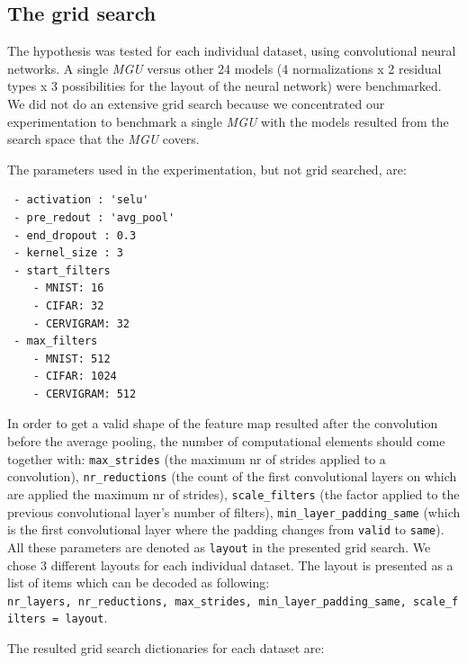 \documentclass[11pt]{article}
\begin{document}
    \hypertarget{the-grid-search}{%
\subsection{The grid search}\label{the-grid-search}}

The hypothesis was tested for each individual dataset, using
convolutional neural networks. A single \emph{MGU} versus other 24
models (4 normalizations x 2 residual types x 3 possibilities for the
layout of the neural network) were benchmarked. We did not do an
extensive grid search because we concentrated our experimentation to
benchmark a single \emph{MGU} with the models resulted from the search
space that the \emph{MGU} covers.

The parameters used in the experimentation, but not grid searched, are:

\begin{verbatim}
 - activation : 'selu'
 - pre_redout : 'avg_pool'
 - end_dropout : 0.3
 - kernel_size : 3
 - start_filters
    - MNIST: 16
    - CIFAR: 32
    - CERVIGRAM: 32
 - max_filters
    - MNIST: 512
    - CIFAR: 1024    
    - CERVIGRAM: 512
\end{verbatim}

In order to get a valid shape of the feature map resulted after the
convolution before the average pooling, the number of computational
elements should come together with: \texttt{max\_strides} (the maximum
nr of strides applied to a convolution), \texttt{nr\_reductions} (the
count of the first convolutional layers on which are applied the maximum
nr of strides), \texttt{scale\_filters} (the factor applied to the
previous convolutional layer's number of filters),
\texttt{min\_layer\_padding\_same} (which is the first convolutional
layer where the padding changes from \texttt{valid} to \texttt{same}).
All these parameters are denoted as \texttt{layout} in the presented
grid search. We chose 3 different layouts for each individual dataset.
The layout is presented as a list of items which can be decoded as
following:
\texttt{nr\_layers,\ nr\_reductions,\ max\_strides,\ min\_layer\_padding\_same,\ scale\_filters\ =\ layout}.

The resulted grid search dictionaries for each dataset are:
\end{document}
